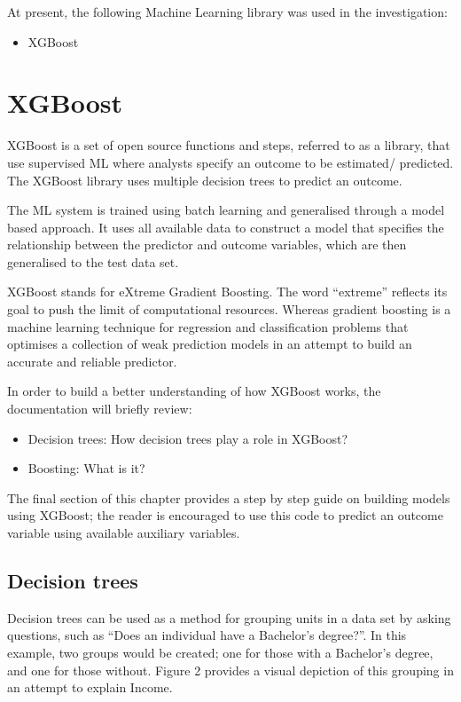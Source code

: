 \documentclass[]{book}
\providecommand{\tightlist}{%
  \setlength{\itemsep}{0pt}\setlength{\parskip}{0pt}}
\begin{document}
At present, the following Machine Learning library was used in the
investigation:

\begin{itemize}
\tightlist
\item
  XGBoost
\end{itemize}

\chapter{XGBoost}\label{xgboost}

XGBoost is a set of open source functions and steps, referred to as a
library, that use supervised ML where analysts specify an outcome to be
estimated/ predicted. The XGBoost library uses multiple decision trees
to predict an outcome.

The ML system is trained using batch learning and generalised through a
model based approach. It uses all available data to construct a model
that specifies the relationship between the predictor and outcome
variables, which are then generalised to the test data set.

XGBoost stands for eXtreme Gradient Boosting. The word ``extreme''
reflects its goal to push the limit of computational resources. Whereas
gradient boosting is a machine learning technique for regression and
classification problems that optimises a collection of weak prediction
models in an attempt to build an accurate and reliable predictor.

In order to build a better understanding of how XGBoost works, the
documentation will briefly review:

\begin{itemize}
\tightlist
\item
  Decision trees: How decision trees play a role in XGBoost?\\
\item
  Boosting: What is it?
\end{itemize}

The final section of this chapter provides a step by step guide on
building models using XGBoost; the reader is encouraged to use this code
to predict an outcome variable using available auxiliary variables.

\section{Decision trees}\label{decision-trees}

Decision trees can be used as a method for grouping units in a data set
by asking questions, such as ``Does an individual have a Bachelor's
degree?''. In this example, two groups would be created; one for those
with a Bachelor's degree, and one for those without. Figure 2 provides a
visual depiction of this grouping in an attempt to explain Income.
\end{document}
